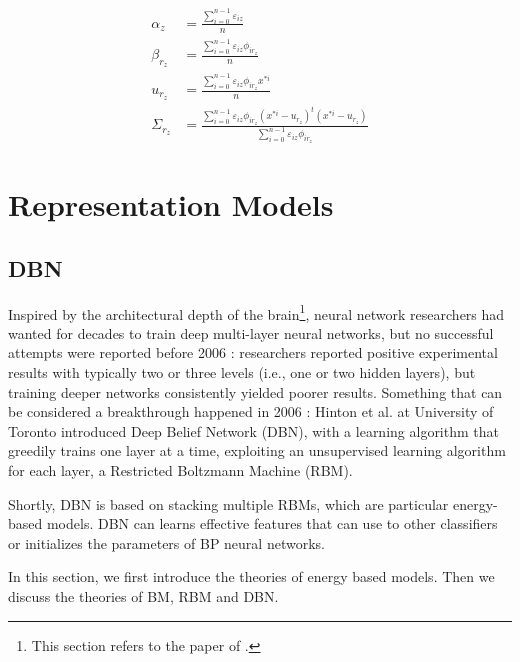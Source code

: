 \documentclass[runningheads,openany]{xhlPaper}
\begin{document}
\begin{equation}
\label{equ:pmmMixtureMixtureDerivationResult}
\begin{aligned}
{\alpha _z} &= \frac{{\sum\limits_{i = 0}^{n - 1} {{\varepsilon _{iz}}} }}{n}\\
{\beta _{{r_z}}} &= \frac{{\sum\limits_{i = 0}^{n - 1} {{\varepsilon _{iz}}{\phi _{i{r_z}}}} }}{n}\\
{u_{{r_z}}} &= \frac{{\sum\limits_{i = 0}^{n - 1} {{\varepsilon _{iz}}{\phi _{i{r_z}}}{x^{*i}}} }}{n}\\
{\Sigma _{{r_z}}} &= \frac{{\sum\limits_{i = 0}^{n - 1} {{\varepsilon _{iz}}{\phi _{i{r_z}}}{{\left( {{x^{*i}} - {u_{r_z}}} \right)}^t}\left( {{x^{*i}} - {u_{r_z}}} \right)} }}{{\sum\limits_{i = 0}^{n - 1} {{\varepsilon _{iz}}{\phi _{i{r_z}}}} }}
\end{aligned}
\end{equation}

\label{sec:gmm}
\chapter{Representation Models}
\section{DBN}
Inspired by the architectural depth of the brain\footnote{This section refers to the paper of \cite{DeepAI_Bengio_2009}.}, neural network researchers had wanted for decades to train deep multi-layer neural networks, but no successful attempts were reported before 2006 : researchers reported positive experimental results with typically two or three levels (i.e., one or two hidden layers), but training deeper networks consistently yielded poorer results. Something that can be considered a breakthrough happened in 2006 : Hinton et al. at University of Toronto introduced Deep Belief Network (DBN), with a learning algorithm that greedily trains one layer at a time, exploiting an unsupervised learning algorithm for each layer, a Restricted Boltzmann Machine (RBM)\cite{DeepAI_Bengio_2009}.

Shortly, DBN is based on stacking multiple RBMs, which are particular energy-based models. DBN can learns effective features that can use to other classifiers or initializes the parameters of BP neural networks.

In this section, we first introduce the theories of energy based models. Then we discuss the theories of BM, RBM and DBN.
\end{document}
